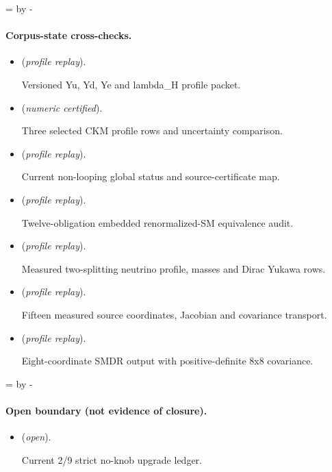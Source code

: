 \documentclass[11pt]{article}
\begin{document}
\par\begingroup{}=\pagegoal\advance{} by -\pagetotal\ifdim\dimen0<7\baselineskip\newpage\fi\endgroup
\paragraph{Corpus-state cross-checks.}
\begin{itemize}
\setlength{\itemsep}{0.25em}
\item {} (\emph{profile replay}).\par Versioned Yu, Yd, Ye and lambda\_H profile packet.
\item {} (\emph{numeric certified}).\par Three selected CKM profile rows and uncertainty comparison.
\item {} (\emph{profile replay}).\par Current non-looping global status and source-certificate map.
\item {} (\emph{profile replay}).\par Twelve-obligation embedded renormalized-SM equivalence audit.
\item {} (\emph{profile replay}).\par Measured two-splitting neutrino profile, masses and Dirac Yukawa rows.
\item {} (\emph{profile replay}).\par Fifteen measured source coordinates, Jacobian and covariance transport.
\item {} (\emph{profile replay}).\par Eight-coordinate SMDR output with positive-definite 8x8 covariance.
\end{itemize}

\par\begingroup{}=\pagegoal\advance{} by -\pagetotal\ifdim\dimen0<7\baselineskip\newpage\fi\endgroup
\paragraph{Open boundary (not evidence of closure).}
\begin{itemize}
\setlength{\itemsep}{0.25em}
\item {} (\emph{open}).\par Current 2/9 strict no-knob upgrade ledger.
\end{itemize}
\end{document}
